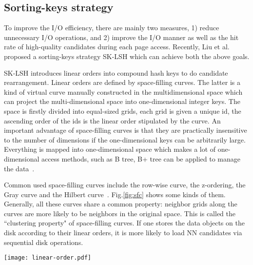 \documentclass[twocolumn]{svjour3}          %
\begin{document}
\subsection{Sorting-keys strategy}
To improve the I/O efficiency, there are mainly two measures, 1) reduce unnecessary I/O operations, and 2) improve the I/O manner as well as the hit rate of high-quality candidates during each page access. Recently, Liu et al. proposed a sorting-keys strategy SK-LSH which can achieve both the above goals. 

SK-LSH introduces linear orders into compound hash keys to do candidate rearrangement. Linear orders are defined by space-filling curves. The latter is a kind of virtual curve manually constructed in the multidimensional space which can project the multi-dimensional space into one-dimensional integer keys. The space is firstly divided into equal-sized grids, each grid is given a unique id, the ascending order of the ids is the linear order stipulated by the curve. An important advantage of space-filling curves is that they are practically insensitive to the number of dimensions if the one-dimensional keys can be arbitrarily large. Everything is mapped into one-dimensional space which makes a lot of one-dimensional access methods, such as B tree, B+ tree can be applied to manage the data~\cite{MultiDAccess98}.

Common used space-filling curves include the row-wise curve, the z-ordering, the Gray curve and the Hilbert curve~\cite{MultiDAccess98}. Fig.\ref{fig:sfc} shows some kinds of them. Generally, all these curves share a common property: neighbor grids along the curves are more likely to be neighbors in the original space. This is called the ``clustering property" of space-filling curves. If one stores the data objects on the disk according to their linear orders, it is more likely to load NN candidates via sequential disk operations.
\begin{figure*}
  \centering
  \texttt{[image: linear-order.pdf]}\\
  \caption{Different kinds of space-filling curves}\label{fig:sfc}
\end{figure*}
\end{document}
